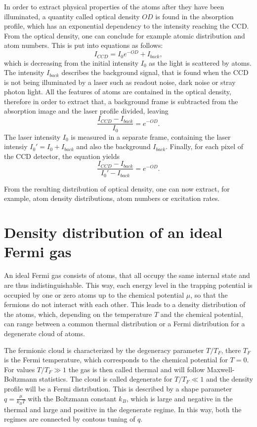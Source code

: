 In order to extract physical properties of the atoms after they have been illuminated, a quantity called optical density $OD$ is found in the absorption profile, which has an exponential dependency to the intensity reaching the CCD. From the optical density, one can conclude for example atomic distribution and atom numbers.
This is put into equations as follows:\cite{Murmann2011}
\begin{equation}
I_{CCD} = I_0 e^{-OD} + I_{back},
\end{equation}
which is decreasing from the initial intensity $I_0$ as the light is scattered by atoms. The intensity $I_{back}$ describes the background signal, that is found when the CCD is not being illuminated by a laser such as readout noise, dark noise or stray photon light. All the features of atoms are contained in the optical density, therefore in order to extract that, a background frame is subtracted from the absorption image and the laser profile divided, leaving
\begin{equation}
\frac{I_{CCD} - I_{back}}{I_0} = e^{-OD}.
\end{equation}
The laser intensity $I_0$ is measured in a separate frame, containing the laser intensiy $I_0' = I_0 + I_{back}$ and also the background $I_{back}$. Finally, for each pixel of the CCD detector, the equation yields
\begin{equation}
\frac{I_{CCD} - I_{back}}{I_0' - I_{back}} = e^{-OD}.
\end{equation}

From the resulting distribution of optical density, one can now extract, for example, atom density distributions, atom numbers or excitation rates.

\section{Density distribution of an ideal Fermi gas}
\label{sec:densdistrfermi}

An ideal Fermi gas consists of atoms, that all occupy the same internal state and are thus indistinguishable. This way, each energy level in the trapping potential is occupied by one or zero atoms up to the chemical potential $\mu$, so that the fermions do not interact with each other. This leads to a density distribution of the atoms, which, depending on the temperature $T$ and the chemical potential, can range between a common thermal distribution or a Fermi distribution for a degenerate cloud of atoms.

The fermionic cloud is characterized by the degeneracy parameter $T/T_F$, there $T_F$ is the Fermi temperature, which corresponds to the chemical potential for $T=0$. For values $T/T_F \gg 1$ the gas is then called thermal and will follow Maxwell-Boltzmann statistics. The cloud is called degenerate for $T/T_F \ll 1$ and the density profile will be a Fermi distribution. This is described by a shape parameter $q=\frac{\mu}{k_BT}$ with the Boltzmann constant $k_B$, which is large and negative in the thermal and large and positive in the degenerate regime. In this way, both the regimes are connected by contous tuning of $q$.

